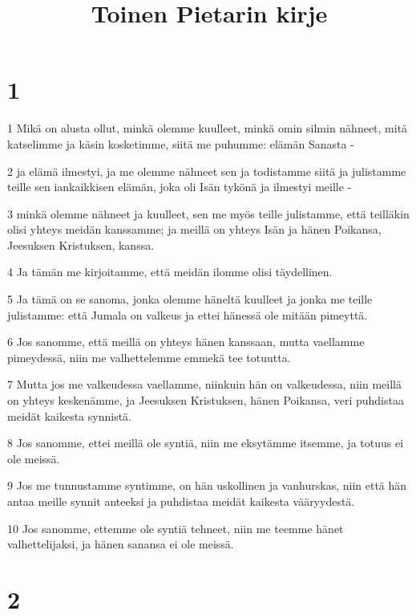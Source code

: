 

\title{Toinen Pietarin kirje}


\chapter{1}

\par 1 Mikä on alusta ollut, minkä olemme kuulleet, minkä omin silmin nähneet, mitä katselimme ja käsin kosketimme, siitä me puhumme: elämän Sanasta -
\par 2 ja elämä ilmestyi, ja me olemme nähneet sen ja todistamme siitä ja julistamme teille sen iankaikkisen elämän, joka oli Isän tykönä ja ilmestyi meille -
\par 3 minkä olemme nähneet ja kuulleet, sen me myös teille julistamme, että teilläkin olisi yhteys meidän kanssamme; ja meillä on yhteys Isän ja hänen Poikansa, Jeesuksen Kristuksen, kanssa.
\par 4 Ja tämän me kirjoitamme, että meidän ilomme olisi täydellinen.
\par 5 Ja tämä on se sanoma, jonka olemme häneltä kuulleet ja jonka me teille julistamme: että Jumala on valkeus ja ettei hänessä ole mitään pimeyttä.
\par 6 Jos sanomme, että meillä on yhteys hänen kanssaan, mutta vaellamme pimeydessä, niin me valhettelemme emmekä tee totuutta.
\par 7 Mutta jos me valkeudessa vaellamme, niinkuin hän on valkeudessa, niin meillä on yhteys keskenämme, ja Jeesuksen Kristuksen, hänen Poikansa, veri puhdistaa meidät kaikesta synnistä.
\par 8 Jos sanomme, ettei meillä ole syntiä, niin me eksytämme itsemme, ja totuus ei ole meissä.
\par 9 Jos me tunnustamme syntimme, on hän uskollinen ja vanhurskas, niin että hän antaa meille synnit anteeksi ja puhdistaa meidät kaikesta vääryydestä.
\par 10 Jos sanomme, ettemme ole syntiä tehneet, niin me teemme hänet valhettelijaksi, ja hänen sanansa ei ole meissä.

\chapter{2}

